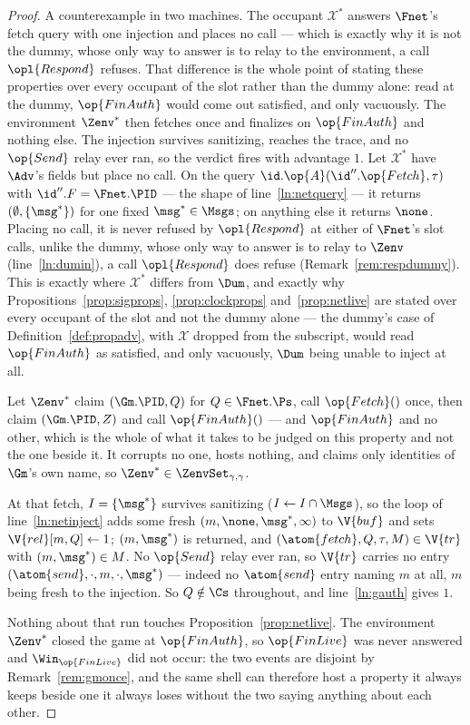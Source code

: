 \documentclass[10pt,oneside,openany]{book}
\theoremstyle{accentdef}
\theoremstyle{accentplain}
\begin{document}
\begin{proof}
A counterexample in two machines. The occupant $\mathcal{X}^{*}$ answers $\Fnet$'s fetch query with
one injection and places no call --- which is exactly why it is not the dummy, whose only way to
answer is to relay to the environment, a call $\opl{Respond}$ refuses. That difference is the whole
point of stating these properties over every occupant of the slot rather than the dummy alone: read
at the dummy, $\op{FinAuth}$ would come out satisfied, and only vacuously. The environment
$\Zenv^{*}$ then fetches once and finalizes on $\op{FinAuth}$ and nothing else. The injection
survives sanitizing, reaches the trace, and no $\op{Send}$ relay ever ran, so the verdict fires with
advantage $1$.
Let $\mathcal{X}^{*}$ have $\Adv$'s fields but place no call. On the query
$\id.\op{A}(\id''.\op{Fetch},\tau)$ with $\id''.F = \Fnet.\PID$ --- the shape of
line~\ref{ln:netquery} --- it returns $(\emptyset,\{\msg^{*}\})$ for one fixed $\msg^{*} \in
\Msgs$; on anything else it returns $\none$. Placing no call, it is never refused by
$\opl{Respond}$ at either of $\Fnet$'s slot calls, unlike the dummy, whose only way to answer is
to relay to $\Zenv$
(line~\ref{ln:dumin}), a call $\opl{Respond}$ does refuse (Remark~\ref{rem:respdummy}). This is
exactly where $\mathcal{X}^{*}$ differs from $\Dum$, and exactly why
Propositions~\ref{prop:sigprops}, \ref{prop:clockprops} and~\ref{prop:netlive} are stated over
every occupant of the slot and not the dummy alone --- the dummy's case
of Definition~\ref{def:propadv}, with $\mathcal{X}$ dropped from the subscript, would read
$\op{FinAuth}$ as satisfied, and only vacuously,
$\Dum$ being unable to inject at all.

Let $\Zenv^{*}$ claim $(\Gm.\PID,Q)$ for $Q \in \Fnet.\Ps$, call $\op{Fetch}()$ once, then claim
$(\Gm.\PID,Z)$ and call $\op{FinAuth}()$ --- and $\op{FinAuth}$ and no other, which is the
whole of what it takes to be judged on this property and not the one beside it. It corrupts no
one, hosts nothing, and claims only
identities of $\Gm$'s own name, so $\Zenv^{*} \in \ZenvSet_{\gamma,\gamma}$.

At that fetch, $I = \{\msg^{*}\}$ survives sanitizing ($I \gets I \cap \Msgs$), so the loop of
line~\ref{ln:netinject} adds some fresh $(m,\none,\msg^{*},\infty)$ to $\V{buf}$ and sets
$\V{rel}[m,Q] \gets 1$; $(m,\msg^{*})$ is returned, and $(\atom{fetch},Q,\tau,M) \in \V{tr}$ with
$(m,\msg^{*}) \in M$. No $\op{Send}$ relay ever ran, so $\V{tr}$ carries no entry
$(\atom{send},\cdot,m,\cdot,\msg^{*})$ --- indeed no $\atom{send}$ entry naming $m$ at all, $m$ being
fresh to the injection. So $Q \notin \Cs$ throughout, and line~\ref{ln:gauth} gives $1$.

Nothing about that run touches Proposition~\ref{prop:netlive}. The environment $\Zenv^{*}$ closed the game at
$\op{FinAuth}$, so $\op{FinLive}$ was never answered and $\Win_{\op{FinLive}}$ did not occur:
the two events are disjoint by Remark~\ref{rem:gmonce}, and the same shell can therefore host a
property it always keeps beside one it always loses without the two saying anything about each
other.
\end{proof}
\end{document}
